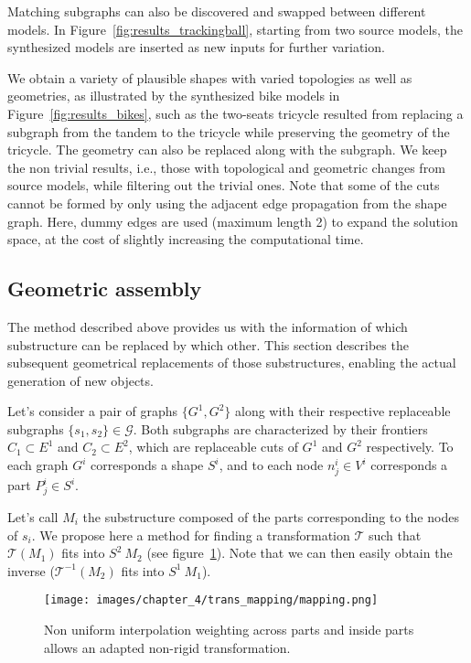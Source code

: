Matching subgraphs can also be discovered and swapped between different models.
In Figure~\ref{fig:results_trackingball}, starting  from two source models, the synthesized models are inserted as new inputs for further variation.

We obtain a variety of plausible shapes with varied topologies as well as geometries, as illustrated by the synthesized bike models in Figure~\ref{fig:results_bikes}, such as the two-seats tricycle resulted from replacing a subgraph from the tandem to the tricycle while preserving the geometry of the tricycle. The geometry can also be replaced along with the subgraph. We keep the non trivial results, i.e., those with topological and geometric changes from source models, while filtering out the trivial ones. Note that some of the cuts cannot be formed by only using the adjacent edge propagation from the shape graph. Here, dummy edges are used (maximum length 2) to expand the solution space, at the cost of slightly increasing the computational time.


\subsection{Geometric assembly}

The method described above provides us with the information of which substructure can be replaced by which other. This section describes the subsequent geometrical replacements of those substructures, enabling the actual generation of new objects.

Let's consider a pair of graphs $\{G^1, G^2\}$ along with their respective replaceable subgraphs $\{s_1,s_2\} \in \mathcal{G}$.
Both subgraphs are characterized by their frontiers $ C_1 \subset E^1$ and $ C_2 \subset E^2$, which are replaceable cuts of $G^1$ and $G^2$ respectively.
To each graph $G^i$ corresponds a shape $S^i$, and to each node $ n_j^i \in V^i$ corresponds a part $P_j^i \in S^i$.

Let's call $M_i$ the substructure composed of the parts corresponding to the nodes of $s_i$.
We propose here a method for finding a transformation $\mathcal{T}$ such that $\mathcal{T}(M_1)$ fits into $S^2 \ M_2$ (see figure~\ref{fig:mapping}). Note that we can then easily obtain the inverse ($\mathcal{T}^{-1}(M_2)$ fits into $S^1 \ M_1$).


\begin{figure}[b!]
	\centering
		\texttt{[image: images/chapter\_4/trans\_mapping/mapping.png]}
	\caption{Non uniform interpolation weighting across parts and inside parts allows an adapted non-rigid transformation.}
	\label{fig:mapping}
\end{figure}

